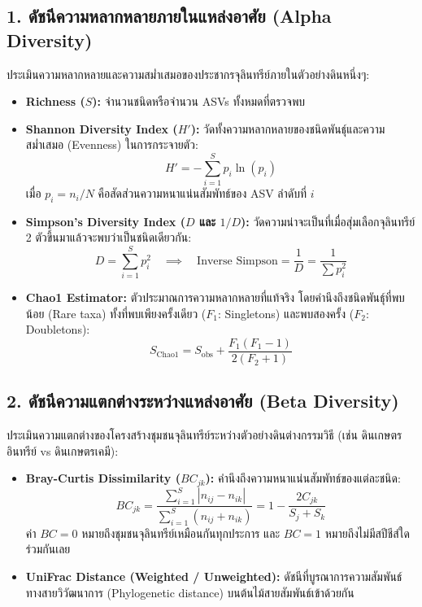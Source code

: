 \subsection{1. ดัชนีความหลากหลายภายในแหล่งอาศัย (Alpha Diversity)}
ประเมินความหลากหลายและความสม่ำเสมอของประชากรจุลินทรีย์ภายในตัวอย่างดินหนึ่งๆ:
\begin{itemize}
    \item \textbf{Richness ($S$):} จำนวนชนิดหรือจำนวน ASVs ทั้งหมดที่ตรวจพบ
    \item \textbf{Shannon Diversity Index ($H'$):} วัดทั้งความหลากหลายของชนิดพันธุ์และความสม่ำเสมอ (Evenness) ในการกระจายตัว:
    \begin{equation}
    H' = - \sum_{i=1}^{S} p_i \ln(p_i)
    \end{equation}
    เมื่อ $p_i = n_i / N$ คือสัดส่วนความหนาแน่นสัมพัทธ์ของ ASV ลำดับที่ $i$
    \item \textbf{Simpson's Diversity Index ($D$ และ $1/D$):} วัดความน่าจะเป็นที่เมื่อสุ่มเลือกจุลินทรีย์ 2 ตัวขึ้นมาแล้วจะพบว่าเป็นชนิดเดียวกัน:
    \begin{equation}
    D = \sum_{i=1}^{S} p_i^2 \quad \implies \quad \text{Inverse Simpson} = \frac{1}{D} = \frac{1}{\sum p_i^2}
    \end{equation}
    \item \textbf{Chao1 Estimator:} ตัวประมาณการความหลากหลายที่แท้จริง โดยคำนึงถึงชนิดพันธุ์ที่พบน้อย (Rare taxa) ทั้งที่พบเพียงครั้งเดียว ($F_1$: Singletons) และพบสองครั้ง ($F_2$: Doubletons):
    \begin{equation}
    S_{\text{Chao1}} = S_{\text{obs}} + \frac{F_1 (F_1 - 1)}{2 (F_2 + 1)}
    \end{equation}
\end{itemize}

\subsection{2. ดัชนีความแตกต่างระหว่างแหล่งอาศัย (Beta Diversity)}
ประเมินความแตกต่างของโครงสร้างชุมชนจุลินทรีย์ระหว่างตัวอย่างดินต่างกรรมวิธี (เช่น ดินเกษตรอินทรีย์ vs ดินเกษตรเคมี):
\begin{itemize}
    \item \textbf{Bray-Curtis Dissimilarity ($BC_{jk}$):} คำนึงถึงความหนาแน่นสัมพัทธ์ของแต่ละชนิด:
    \begin{equation}
    BC_{jk} = \frac{\sum_{i=1}^{S} |n_{ij} - n_{ik}|}{\sum_{i=1}^{S} (n_{ij} + n_{ik})} = 1 - \frac{2 C_{jk}}{S_j + S_k}
    \end{equation}
    ค่า $BC = 0$ หมายถึงชุมชนจุลินทรีย์เหมือนกันทุกประการ และ $BC = 1$ หมายถึงไม่มีสปีชีส์ใดร่วมกันเลย
    \item \textbf{UniFrac Distance (Weighted / Unweighted):} ดัชนีที่บูรณาการความสัมพันธ์ทางสายวิวัฒนาการ (Phylogenetic distance) บนต้นไม้สายสัมพันธ์เข้าด้วยกัน
\end{itemize}

